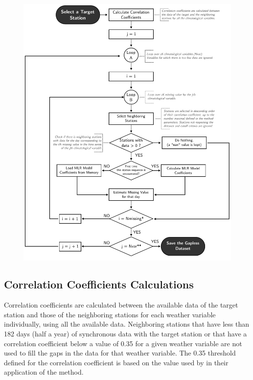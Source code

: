 \documentclass[TechnicalNoteMeteo.tex]{subfiles}
\begin{document}
\begin{figure}[!p]
    \centering
    \includegraphics[width=\textwidth]{img/Flowchart-filling_missing_weather.pdf} 
    \caption{}
    \label{fig:fillworker_flowchart}
\end{figure}

\subsection{Correlation Coefficients Calculations}

Correlation coefficients are calculated between the available data of the target station and those of the neighboring stations for each weather variable individually, using all the available data. Neighboring stations that have less than 182 days (half a year) of synchronous data with the target station or that have a correlation coefficient below a value of 0.35 for a given weather variable are not used to fill the gaps in the data for that weather variable. The 0.35 threshold defined for the correlation coefficient is based on the value used by \cite{eischeid_creating_2000} in their application of the method. 
\end{document}
